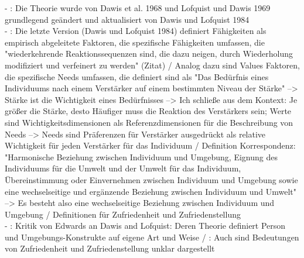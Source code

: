 - \cite[S. 29ff.]{edwards:2008}: Die Theorie wurde von Dawis et al. 1968 und Lofquist und Dawis 1969 grundlegend geändert und aktualisiert von Dawis und Lofquist 1984 \\
- \cite[S. 31]{edwards:2008}: Die letzte Version (Dawis und Lofquist 1984) definiert Fähigkeiten als empirisch abgeleitete Faktoren, die spezifische Fähigkeiten umfassen, die "wiederkehrende Reaktionssequenzen sind, die dazu neigen, durch Wiederholung modifiziert und verfeinert zu werden" (Zitat) / Analog dazu sind Values Faktoren, die spezifische Needs umfassen, die definiert sind als "Das Bedürfnis eines Individuums nach einem Verstärker auf einem bestimmten Niveau der Stärke" --> Stärke ist die Wichtigkeit eines Bedürfnisses --> Ich schließe aus dem Kontext: Je größer die Stärke, desto Häufiger muss die Reaktion des Verstärkers sein; Werte sind Wichtigkeitsdimensionen als Referenzdimensionen für die Beschreibung von Needs --> Needs sind Präferenzen für Verstärker ausgedrückt als relative Wichtigkeit für jeden Verstärker für das Individuum / Definition Korrespondenz: "Harmonische Beziehung zwischen Individuum und Umgebung, Eignung des Individuums für die Umwelt und der Umwelt für das Individuum, Übereinstimmung oder Einvernehmen zwischen Individuum und Umgebung sowie eine wechselseitige und ergänzende Beziehung zwischen Individuum und Umwelt" --> Es besteht also eine wechselseitige Beziehung zwischen Individuum und Umgebung / Definitionen für Zufriedenheit und Zufriedenstellung \\
- \cite[S. 32]{edwards:2008}: Kritik von Edwards an Dawis and Lofquist: Deren Theorie definiert Person und Umgebungs-Konstrukte auf eigene Art und Weise / \cite[S. 33]{edwards:2008}:  Auch sind Bedeutungen von Zufriedenheit und Zufriedenstellung unklar dargestellt

